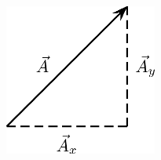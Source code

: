 	\begin{figure}[H] %
    \begin{center}
    \label{m38819*id192986!!!underscore!!!media}\label{m38819*id192986!!!underscore!!!printimage}\includegraphics[width=5cm]{col11305.imgs/m38819_PG11C1_059.png} %
        
      \vspace{2pt}
    \vspace{.1in}
    
    \end{center}

 \end{figure}   

    \addtocounter{footnote}{-0}
    
      \par 
\label{m38819*secfhsst!!!underscore!!!id1989}\vspace{.5cm} 
      
